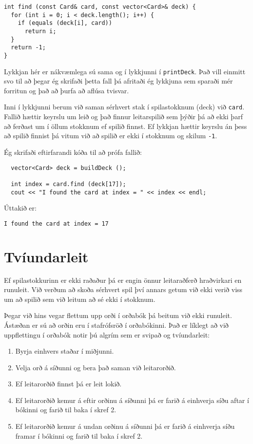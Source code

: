 \begin{verbatim}
int find (const Card& card, const vector<Card>& deck) {
  for (int i = 0; i < deck.length(); i++) {
    if (equals (deck[i], card)) 
      return i;
  }
  return -1;
}
\end{verbatim}
%
Lykkjan hér er nákvæmlega sú sama og í lykkjunni í {\tt printDeck}.
Það vill einmitt svo til að þegar ég skrifaði þetta fall þá afritaði ég lykkjuna sem sparaði mér forritun
og það að þurfa að aflúsa tvisvar.

Inni í lykkjunni berum við saman sérhvert stak í spilastokknum (deck) við {\tt card}.
Fallið hættir keyrslu um leið og það finnur leitarspilið sem þýðir þá að ekki þarf að ferðast um
í öllum stokknum ef spilið finnst.
Ef lykkjan hættir keyrslu án þess að spilið finnist þá vitum við að spilið er ekki í stokknum og skilum {\tt -1}.


Ég skrifaði eftirfarandi kóða til að prófa fallið: 

\begin{verbatim}
  vector<Card> deck = buildDeck ();

  int index = card.find (deck[17]);
  cout << "I found the card at index = " << index << endl;
\end{verbatim}
%
Úttakið er:
\begin{verbatim}
I found the card at index = 17
\end{verbatim}
%

\section{Tvíundarleit}

Ef spilastokkurinn er ekki raðaður þá er engin önnur leitaraðferð hraðvirkari en runuleit.
Við verðum að skoða sérhvert spil því annars getum við ekki verið viss um að spilið sem við leitum að sé ekki í stokknum.

Þegar við hins vegar flettum upp orði í orðabók þá beitum við ekki runuleit.
Ástæðan er sú að orðin eru í stafrófsröð í orðabókinni.
Það er líklegt að við uppflettingu í orðabók notir þú algrím sem er svipað og tvíundarleit:

\begin {enumerate}

\item Byrja einhvers staðar í miðjunni. 

\item Velja orð á síðunni og bera það saman við leitarorðið.

\item Ef leitarorðið finnst þá er leit lokið. 

\item Ef leitarorðið kemur á eftir orðinu á síðunni þá er farið á einhverja síðu aftar í bókinni og farið til baka í skref 2. 

\item Ef leitarorðið kemur á undan orðinu á síðunni þá er farið á einhverja síðu framar í bókinni og farið til baka í skref 2.

\end {enumerate}

